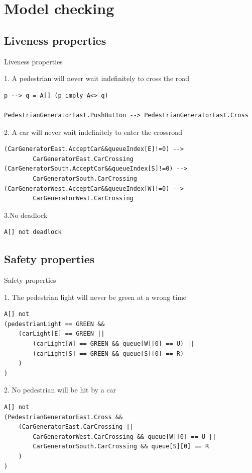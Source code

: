\documentclass{bredelebeamer}
\begin{document}
\section{Model checking}
\subsection{Liveness properties}
\begin{frame}[fragile]{Liveness properties}

\begin{block}{1. A pedestrian will never wait indefinitely to cross the road}
\begin{verbatim}
p --> q = A[] (p imply A<> q)

PedestrianGeneratorEast.PushButton --> PedestrianGeneratorEast.Cross
\end{verbatim}
\end{block}

\begin{block}{2. A car will never wait indefinitely to enter the crossroad}
\begin{verbatim}
(CarGeneratorEast.AcceptCar&&queueIndex[E]!=0) -->
        CarGeneratorEast.CarCrossing
(CarGeneratorSouth.AcceptCar&&queueIndex[S]!=0) -->
        CarGeneratorSouth.CarCrossing
(CarGeneratorWest.AcceptCar&&queueIndex[W]!=0) -->
        CarGeneratorWest.CarCrossing
\end{verbatim}
\end{block}

\begin{block}{3.No deadlock}
\begin{verbatim}
A[] not deadlock
\end{verbatim}
\end{block}

\end{frame}

\subsection{Safety properties}
\begin{frame}[fragile]{Safety properties}
\begin{block}{1. The pedestrian light will never be green at a wrong time}
\begin{verbatim}
A[] not
(pedestrianLight == GREEN &&
    (carLight[E] == GREEN ||
        (carLight[W] == GREEN && queue[W][0] == U) ||
        (carLight[S] == GREEN && queue[S][0] == R)
    )
)
\end{verbatim}
\end{block}

\begin{block}{2. No pedestrian will be hit by a car}
\begin{verbatim}
A[] not
(PedestrianGeneratorEast.Cross &&
    (CarGeneratorEast.CarCrossing ||
        CarGeneratorWest.CarCrossing && queue[W][0] == U ||
        CarGeneratorSouth.CarCrossing && queue[S][0] == R
    )
)
\end{verbatim}
\end{block}
\end{frame}
\end{document}
